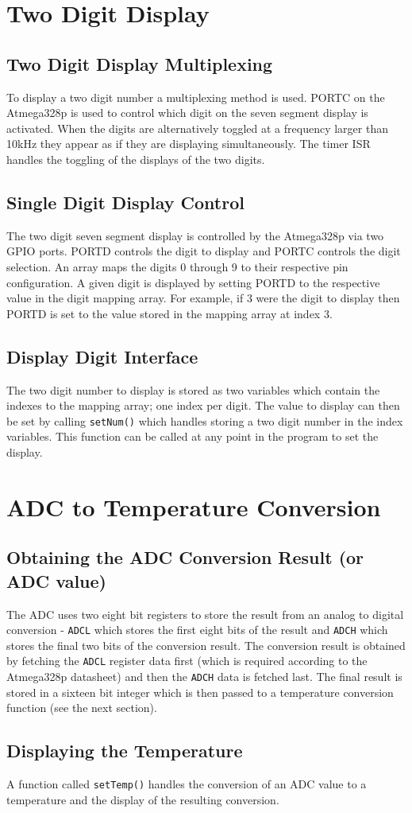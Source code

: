 \documentclass[a4paper]{article}
\begin{document}
	\section{Two Digit Display}
		\subsection{Two Digit Display Multiplexing}
		To display a two digit number a multiplexing method is used. PORTC on the
		Atmega328p is used to control which digit on the seven segment display is
		activated. When the digits are alternatively toggled at a frequency larger
		than 10kHz they appear as if they are displaying simultaneously. The timer  
		ISR handles the toggling of the displays of the two digits.


		\subsection{Single Digit Display Control}
		The two digit seven segment display is controlled by the Atmega328p via two GPIO
		ports. PORTD controls the digit to display and PORTC controls the digit
		selection. An array maps the digits 0 through 9 to their respective pin
		configuration. A given digit is displayed by setting PORTD to the respective
		value in the digit mapping array. For example, if 3 were the digit to display
		then PORTD is set to the value stored in the mapping array at index 3. 

		\subsection{Display Digit Interface}
		The two digit number to display is stored as two variables which
		contain the indexes to the mapping array; one index per digit. The value to
		display can then be set by calling \lstinline{setNum()} which handles
		storing a two digit number in the index variables. This function can be
		called at any point in the program to set the display.

	\section{ADC to Temperature Conversion}
		\subsection{Obtaining the ADC Conversion Result (or ADC value)}
		The ADC uses two eight bit registers to store the result from an analog to
		digital conversion - \lstinline{ADCL} which stores the first eight bits of
		the result and \lstinline{ADCH} which stores the final two bits of the
		conversion result. The conversion result is obtained by fetching the
		\lstinline{ADCL} register data first (which is required according to the
		Atmega328p datasheet) and then the \lstinline{ADCH} data is fetched last.
		The final result is stored in a sixteen bit integer which is then passed to
		a temperature conversion function (see the next section). 

		\subsection{Displaying the Temperature}
		A function called \lstinline{setTemp()} handles the conversion of an ADC
		value to a temperature and the display of the resulting conversion. 
\end{document}
